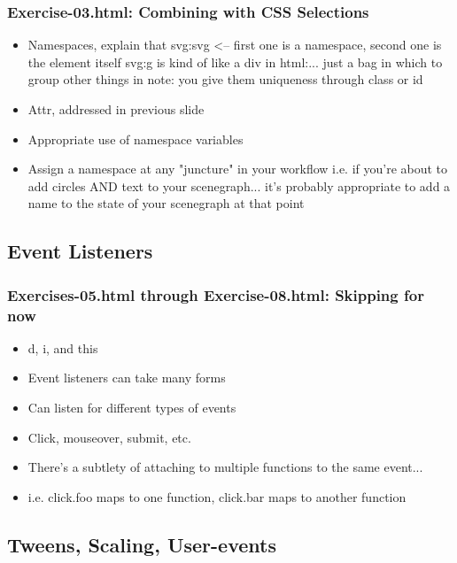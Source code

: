 \documentclass{beamer}
\begin{document}
\begin{frame}
    \frametitle{Exercise-03.html: Combining with CSS Selections}
    \begin{itemize}
    \item Namespaces, explain that svg:svg <-- first one is a namespace, second one is the element itself svg:g is kind of like a div in html:... just a bag in which to group other things in note: you give them uniqueness through class or id
    \item Attr, addressed in previous slide
    \item Appropriate use of namespace variables
    \item Assign a namespace at any "juncture" in your workflow i.e. if you're about to add circles AND text to your scenegraph... it's probably appropriate to add a name to the state of your scenegraph at that point
    \end{itemize}
\end{frame}



\subsection{Event Listeners}

\begin{frame}
    \frametitle{Exercises-05.html through Exercise-08.html: Skipping for now}
    \begin{itemize}
    \item d, i, and this
    \item Event listeners can take many forms
    \item Can listen for different types of events
    \item Click, mouseover, submit, etc.
    \item There's a subtlety of attaching to multiple functions to the same event...
    \item i.e. click.foo maps to one function, click.bar maps to another function
    \end{itemize}
\end{frame}



\subsection{Tweens, Scaling, User-events}
\end{document}
